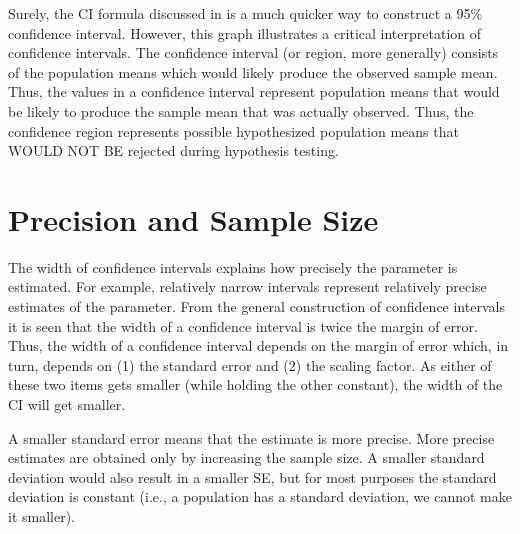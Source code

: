 \documentclass[10pt,openany]{book}\usepackage[]{graphicx}\usepackage[]{color}
\begin{document}
Surely, the CI formula discussed in  is a much quicker way to construct a 95\% confidence interval.  However, this graph illustrates a critical interpretation of confidence intervals.  The confidence interval (or region, more generally) consists of the population means which would likely produce the observed sample mean.  Thus, the values in a confidence interval represent population means that would be likely to produce the sample mean that was actually observed.  Thus, the confidence region represents possible hypothesized population means that WOULD NOT BE rejected during hypothesis testing.



\section{Precision and Sample Size} 
The width of confidence intervals explains how precisely the parameter is estimated.  For example, relatively narrow intervals represent relatively precise estimates of the parameter.  From the general construction of confidence intervals it is seen that the width of a confidence interval is twice the margin of error.  Thus, the width of a confidence interval depends on the margin of error which, in turn, depends on (1) the standard error and (2) the scaling factor.  As either of these two items gets smaller (while holding the other constant), the width of the CI will get smaller.


\vspace{-12pt}

A smaller standard error means that the estimate is more precise.  More precise estimates are obtained only by increasing the sample size.  A smaller standard deviation would also result in a smaller SE, but for most purposes the standard deviation is constant (i.e., a population has a standard deviation, we cannot make it smaller).

\end{document}
